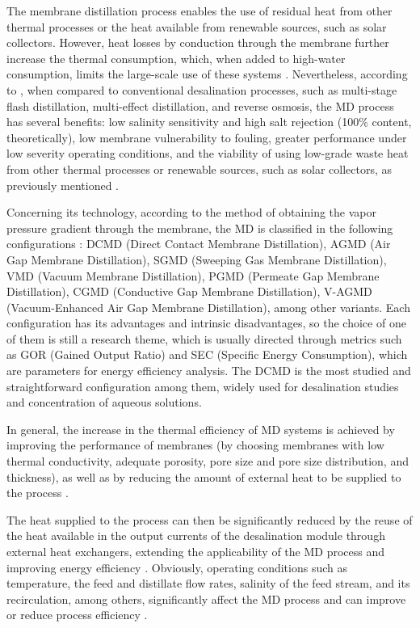 \documentclass[14pt,letterpaper,fleqn]{extarticle}
\begin{document}
The membrane distillation process enables the use of residual heat from other thermal
processes or the heat available from renewable sources, such as solar collectors.
However, heat losses by conduction through the membrane further increase the thermal
consumption, which, when added to high-water consumption, limits the large-scale use of
these systems \citep{Khayet2011}. Nevertheless, according to \citet{Guan2015}, when
compared to conventional desalination processes, such as multi-stage flash distillation,
multi-effect distillation, and reverse osmosis, the MD process has several benefits:
low salinity sensitivity and high salt rejection (100\% content, theoretically), low
membrane vulnerability to fouling, greater performance under low severity operating
conditions, and the viability of using low-grade waste heat from other thermal processes
or renewable sources, such as solar collectors, as previously mentioned
\citep{Curcio2005, Charcosset2009, Drioli2015}.

Concerning its technology, according to the method of obtaining the vapor pressure
gradient through the membrane, the MD is classified in the following configurations
\citep{Zhang2015, Swaminathan2018}: DCMD (Direct Contact Membrane Distillation), AGMD
(Air Gap Membrane Distillation), SGMD (Sweeping Gas Membrane Distillation), VMD
(Vacuum Membrane Distillation), PGMD (Permeate Gap Membrane Distillation), CGMD
(Conductive Gap Membrane Distillation), V-AGMD (Vacuum-Enhanced Air Gap Membrane
Distillation), among other variants. Each configuration has its advantages and intrinsic
disadvantages, so the choice of one of them is still a research theme, which is usually
directed through metrics such as GOR (Gained Output Ratio) and SEC (Specific Energy
Consumption), which are parameters for energy efficiency analysis. The DCMD is the most
studied and straightforward configuration among them, widely used for desalination
studies and concentration of aqueous solutions.

In general, the increase in the thermal efficiency of MD systems is achieved by improving
the performance of membranes (by choosing membranes with low thermal conductivity,
adequate porosity, pore size and pore size distribution, and thickness), as well as by
reducing the amount of external heat to be supplied to the process
\citep{Gostoli1998, Khayet2006, AlObaidani2008, Yao2013, Li2014, Swaminathan2018}.

The heat supplied to the process can then be significantly reduced by the reuse of the
heat available in the output currents of the desalination module through external heat
exchangers, extending the applicability of the MD process and improving energy efficiency
\citep{Gilron2007, Lee2011, Hausmann2012, Lu2012, Zhang2015, GonzalezBravo2015,
Kim2015, Maheswari2015, Lin2014, Gustafson2018, Christie2020, Lisboa2021, Sampaio2022}.
Obviously, operating conditions such as temperature, the feed and distillate flow rates,
salinity of the feed stream, and its recirculation, among others, significantly affect
the MD process and can improve or reduce process efficiency
\citep{Khayet2000, Wang2009, Zhang2010, Fan2012, Alkhudhiri2012, Guan2014}.
\end{document}
